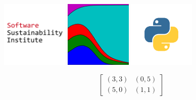\documentclass{beamer}
\begin{document}
\begin{frame}
\begin{center}
    \hspace{-6pt}\includegraphics[width=0.24\textwidth]{static/ssi-logo.png}\hspace{6pt}
    \includegraphics[width=0.24\textwidth, height=0.245\textwidth]{static/axelrod-logo.png}\hspace{6pt}
    \includegraphics[width=0.24\textwidth]{static/python.png}
    \end{center}
\end{frame}

\begin{frame}
    \begin{center}
    \LARGE{
        \begin{equation*}
            \begin{bmatrix}
                (3, 3) & (0, 5)  \\
                (5, 0) & (1, 1)
            \end{bmatrix}
        \end{equation*}}
    \end{center}
\end{frame}

\begin{frame}
    \begin{center}
    
    \end{center}
\end{frame}

\begin{frame}
    \begin{center}
    
    \end{center}
\end{frame}
\end{document}
